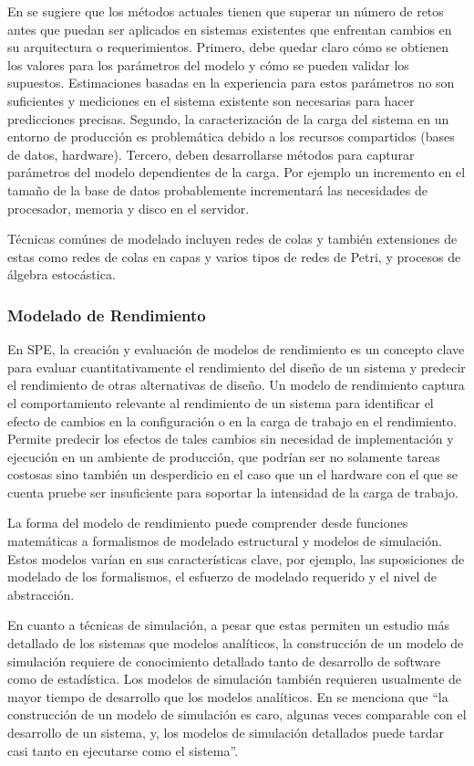 En \cite{Jin:2007:PEP:1248820.1248885} se sugiere que los métodos actuales tienen que superar un número de retos antes que puedan ser aplicados en sistemas existentes que enfrentan cambios en su arquitectura o requerimientos. Primero, debe quedar claro cómo se obtienen los valores para los parámetros del modelo y cómo se pueden validar los supuestos. Estimaciones basadas en la experiencia para estos parámetros no son suficientes y mediciones en el sistema existente son necesarias para hacer predicciones precisas. Segundo, la caracterización de la carga del sistema en un entorno de producción es problemática debido a los recursos compartidos (bases de datos, hardware). Tercero, deben desarrollarse métodos para capturar parámetros del modelo dependientes de la carga. Por ejemplo un incremento en el tamaño de la base de datos probablemente incrementará las necesidades de procesador, memoria y disco en el servidor.

Técnicas comúnes de modelado incluyen redes de colas y también extensiones de estas como redes de colas en capas y varios tipos de redes de Petri, y procesos de álgebra estocástica.

\subsubsection{Modelado de Rendimiento}
En SPE, la creación y evaluación de modelos de rendimiento es un concepto clave para evaluar cuantitativamente el rendimiento del diseño de un sistema y predecir el rendimiento de otras alternativas de diseño. Un modelo de rendimiento captura el comportamiento relevante al rendimiento de un sistema para identificar el efecto de cambios en la configuración o en la carga de trabajo en el rendimiento. Permite predecir los efectos de tales cambios sin necesidad de implementación y ejecución en un ambiente de producción, que podrían ser no solamente tareas costosas sino también un desperdicio en el caso que un el hardware con el que se cuenta pruebe ser insuficiente para soportar la intensidad de la carga de trabajo.\cite{Noorshams2015_1000046750}

La forma del modelo de rendimiento puede comprender desde funciones matemáticas a formalismos de modelado estructural y modelos de simulación. Estos modelos varían en sus características clave, por ejemplo, las suposiciones de modelado de los formalismos, el esfuerzo de modelado requerido y el nivel de abstracción.

En cuanto a técnicas de simulación, a pesar que estas permiten un estudio más detallado de los sistemas que modelos analíticos, la construcción de un modelo de simulación requiere de conocimiento detallado tanto de desarrollo de software como de estadística\cite{Gooijer2011PerformanceMO}. Los modelos de simulación también requieren usualmente de mayor tiempo de desarrollo que los modelos analíticos. En \cite{4221619} se menciona que ``la construcción de un modelo de simulación es caro, algunas veces comparable con el desarrollo de un sistema, y, los modelos de simulación detallados puede tardar casi tanto en ejecutarse como el sistema''.

